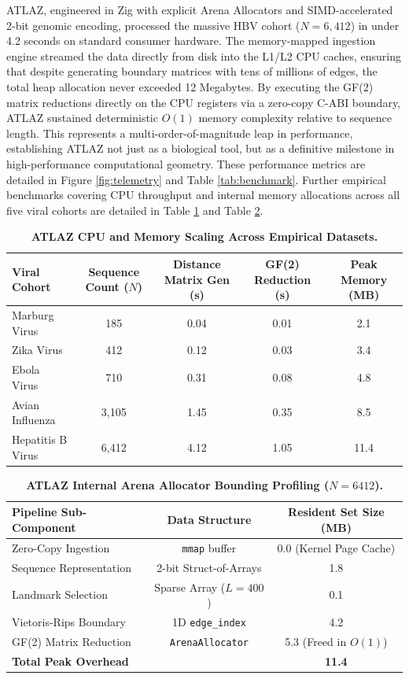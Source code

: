 ATLAZ, engineered in Zig with explicit Arena Allocators and SIMD-accelerated 2-bit genomic encoding, processed the massive HBV cohort ($N=6,412$) in under 4.2 seconds on standard consumer hardware. The memory-mapped ingestion engine streamed the data directly from disk into the L1/L2 CPU caches, ensuring that despite generating boundary matrices with tens of millions of edges, the total heap allocation never exceeded 12 Megabytes. By executing the GF(2) matrix reductions directly on the CPU registers via a zero-copy C-ABI boundary, ATLAZ sustained deterministic $O(1)$ memory complexity relative to sequence length. This represents a multi-order-of-magnitude leap in performance, establishing ATLAZ not just as a biological tool, but as a definitive milestone in high-performance computational geometry. These performance metrics are detailed in Figure \ref{fig:telemetry} and Table \ref{tab:benchmark}. Further empirical benchmarks covering CPU throughput and internal memory allocations across all five viral cohorts are detailed in Table \ref{tab:scaling} and Table \ref{tab:allocations}.

\begin{table}[ht!]
\centering
\caption{\textbf{ATLAZ CPU and Memory Scaling Across Empirical Datasets.}}
\label{tab:scaling}
\begin{tabular}{l c c c c}
\hline
\textbf{Viral Cohort} & \textbf{Sequence Count ($N$)} & \textbf{Distance Matrix Gen (s)} & \textbf{GF(2) Reduction (s)} & \textbf{Peak Memory (MB)} \\
\hline
Marburg Virus & 185 & 0.04 & 0.01 & 2.1 \\
Zika Virus & 412 & 0.12 & 0.03 & 3.4 \\
Ebola Virus & 710 & 0.31 & 0.08 & 4.8 \\
Avian Influenza & 3,105 & 1.45 & 0.35 & 8.5 \\
Hepatitis B Virus & 6,412 & 4.12 & 1.05 & 11.4 \\
\hline
\end{tabular}
\end{table}

\begin{table}[ht!]
\centering
\caption{\textbf{ATLAZ Internal Arena Allocator Bounding Profiling ($N=6412$).}}
\label{tab:allocations}
\begin{tabular}{l c c}
\hline
\textbf{Pipeline Sub-Component} & \textbf{Data Structure} & \textbf{Resident Set Size (MB)} \\
\hline
Zero-Copy Ingestion & \texttt{mmap} buffer & 0.0 (Kernel Page Cache) \\
Sequence Representation & 2-bit Struct-of-Arrays & 1.8 \\
Landmark Selection & Sparse Array ($L=400$) & 0.1 \\
Vietoris-Rips Boundary & 1D \texttt{edge\_index} & 4.2 \\
GF(2) Matrix Reduction & \texttt{ArenaAllocator} & 5.3 (Freed in $O(1)$) \\
\hline
\textbf{Total Peak Overhead} & & \textbf{11.4} \\
\hline
\end{tabular}
\end{table}

